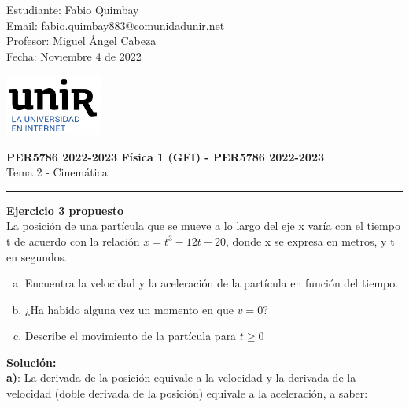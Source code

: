 \documentclass[11pt,letterpaper]{article}
\begin{document}
\pagestyle{plain}

\begin{flushleft}
Estudiante: Fabio Quimbay\\
Email: fabio.quimbay883@comunidadunir.net\\
Profesor: Miguel Ángel Cabeza\\
Fecha: Noviembre 4 de 2022\\
\end{flushleft}

\begin{flushright}\vspace{-20mm}
\includegraphics[height=2cm]{logo.png}
\end{flushright}
 
\begin{center}\vspace{0cm}
\textbf{\large PER5786 2022-2023  Física 1 (GFI) - PER5786 2022-2023}\\
 Tema 2 - Cinemática
\end{center}

 
\rule{\linewidth}{0.1mm}

\bigskip
\bigskip

\textbf{Ejercicio 3 propuesto}\\

La posición de una partícula que se mueve a lo largo del eje x varía con el tiempo t de acuerdo con la relación $x = t^3 - 12t + 20$, donde x se expresa en metros, y t en segundos.

\begin{enumerate}[(a)] 
\item {Encuentra la velocidad y la aceleración de la partícula en función del tiempo.}
\item {¿Ha habido alguna vez un momento en que $v = 0$?}
\item {Describe el movimiento de la partícula para $t \ge 0$}
\end{enumerate}

\textbf{Solución:}\\

\textbf{a)}: La derivada de la posición equivale a la velocidad y la derivada de la velocidad (doble derivada de la posición) equivale a la aceleración, a saber:
\end{document}
